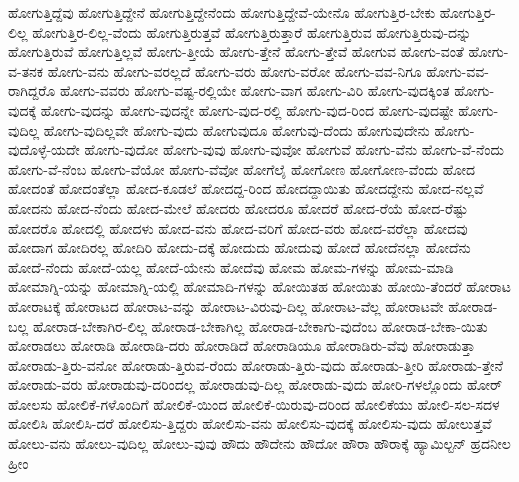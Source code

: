 {ಹೋಗುತ್ತಿದ್ದೆವು
ಹೋಗುತ್ತಿದ್ದೇನೆ
ಹೋಗುತ್ತಿದ್ದೇನೆಂದು
ಹೋಗುತ್ತಿದ್ದೇವೆ-ಯೇನೊ
ಹೋಗುತ್ತಿರ-ಬೇಕು
ಹೋಗುತ್ತಿರ-ಲಿಲ್ಲ
ಹೋಗುತ್ತಿರ-ಲಿಲ್ಲ-ವೆಂದು
ಹೋಗುತ್ತಿರುತ್ತವೆ
ಹೋಗುತ್ತಿರುತ್ತಾರೆ
ಹೋಗುತ್ತಿರುವ
ಹೋಗುತ್ತಿರುವು-ದನ್ನು
ಹೋಗುತ್ತಿರುವೆ
ಹೋಗುತ್ತಿಲ್ಲವೆ
ಹೋಗು-ತ್ತೀಯೆ
ಹೋಗು-ತ್ತೇನೆ
ಹೋಗು-ತ್ತೇವೆ
ಹೋಗುವ
ಹೋಗು-ವಂತೆ
ಹೋಗು-ವ-ತನಕ
ಹೋಗು-ವನು
ಹೋಗು-ವರಲ್ಲದೆ
ಹೋಗು-ವರು
ಹೋಗು-ವರೋ
ಹೋಗು-ವವ-ನಿಗೂ
ಹೋಗು-ವವ-ರಾಗಿದ್ದರೊ
ಹೋಗು-ವವರು
ಹೋಗು-ವಷ್ಟ-ರಲ್ಲಿಯೇ
ಹೋಗು-ವಾಗ
ಹೋಗು-ವಿರಿ
ಹೋಗು-ವುದಕ್ಕಿಂತ
ಹೋಗು-ವುದಕ್ಕೆ
ಹೋಗು-ವುದನ್ನು
ಹೋಗು-ವುದನ್ನೇ
ಹೋಗು-ವುದ-ರಲ್ಲಿ
ಹೋಗು-ವುದ-ರಿಂದ
ಹೋಗು-ವುದಷ್ಟೇ
ಹೋಗು-ವುದಿಲ್ಲ
ಹೋಗು-ವುದಿಲ್ಲವೇ
ಹೋಗು-ವುದು
ಹೋಗುವುದೂ
ಹೋಗುವು-ದೆಂದು
ಹೋಗುವುದೇನು
ಹೋಗು-ವುದೊಳ್ಳೆ-ಯದೇ
ಹೋಗು-ವುದೋ
ಹೋಗು-ವುವು
ಹೋಗು-ವುವೋ
ಹೋಗುವೆ
ಹೋಗು-ವೆನು
ಹೋಗು-ವೆ-ನೆಂದು
ಹೋಗು-ವೆ-ನೆಂಬ
ಹೋಗು-ವೆಯೋ
ಹೋಗು-ವೆವೋ
ಹೋಗೆಲೈ
ಹೋಗೋಣ
ಹೋಗೋಣ-ವೆಂದು
ಹೋದ
ಹೋದಂತೆ
ಹೋದಂತೆಲ್ಲಾ
ಹೋದ-ಕೂಡಲೆ
ಹೋದದ್ದ-ರಿಂದ
ಹೋದದ್ದಾಯಿತು
ಹೋದದ್ದೇನು
ಹೋದ-ನಲ್ಲವೆ
ಹೋದನು
ಹೋದ-ನೆಂದು
ಹೋದ-ಮೇಲೆ
ಹೋದರು
ಹೋದರೂ
ಹೋದರೆ
ಹೋದ-ರೆಯೆ
ಹೋದ-ರೆಷ್ಟು
ಹೋದರೊ
ಹೋದಲ್ಲಿ
ಹೋದಳು
ಹೋದ-ವನು
ಹೋದ-ವರಿಗೆ
ಹೋದ-ವರು
ಹೋದ-ವರೆಲ್ಲಾ
ಹೋದವು
ಹೋದಾಗ
ಹೋದಿರಲ್ಲ
ಹೋದಿರಿ
ಹೋದು-ದಕ್ಕೆ
ಹೋದುದು
ಹೋದುವು
ಹೋದೆ
ಹೋದೆನಲ್ಲಾ
ಹೋದೆನು
ಹೋದೆ-ನೆಂದು
ಹೋದೆ-ಯಲ್ಲ
ಹೋದೆ-ಯೇನು
ಹೋದೆವು
ಹೋಮ
ಹೋಮ-ಗಳನ್ನು
ಹೋಮ-ಮಾಡಿ
ಹೋಮಾಗ್ನಿ-ಯನ್ನು
ಹೋಮಾಗ್ನಿ-ಯಲ್ಲಿ
ಹೋಮಾದಿ-ಗಳನ್ನು
ಹೋಯಿತಹ
ಹೋಯಿತು
ಹೋಯಿ-ತೆಂದರೆ
ಹೋರಾಟ
ಹೋರಾಟಕ್ಕೆ
ಹೋರಾಟದ
ಹೋರಾಟ-ವನ್ನು
ಹೋರಾಟ-ವಿರುವು-ದಿಲ್ಲ
ಹೋರಾಟ-ವೆಲ್ಲ
ಹೋರಾಟವೇ
ಹೋರಾಡ-ಬಲ್ಲ
ಹೋರಾಡ-ಬೇಕಾಗಿರ-ಲಿಲ್ಲ
ಹೋರಾಡ-ಬೇಕಾಗಿಲ್ಲ
ಹೋರಾಡ-ಬೇಕಾಗು-ವುದೆಂಬ
ಹೋರಾಡ-ಬೇಕಾ-ಯಿತು
ಹೋರಾಡಲು
ಹೋರಾಡಿ
ಹೋರಾಡಿ-ದರು
ಹೋರಾಡಿದೆ
ಹೋರಾಡಿಯೂ
ಹೋರಾಡಿರು-ವೆವು
ಹೋರಾಡುತ್ತಾ
ಹೋರಾಡು-ತ್ತಿರು-ವನೋ
ಹೋರಾಡು-ತ್ತಿರುವ-ರೆಂದು
ಹೋರಾಡು-ತ್ತಿರು-ವುದು
ಹೋರಾಡು-ತ್ತೀರಿ
ಹೋರಾಡು-ತ್ತೇನೆ
ಹೋರಾಡು-ವರು
ಹೋರಾಡುವು-ದರಿಂದಲ್ಲ
ಹೋರಾಡುವು-ದಿಲ್ಲ
ಹೋರಾಡು-ವುದು
ಹೋರಿ-ಗಳಲ್ಲೊಂದು
ಹೋರ್
ಹೋಲಸು
ಹೋಲಿಕೆ-ಗಳೊಂದಿಗೆ
ಹೋಲಿಕೆ-ಯಿಂದ
ಹೋಲಿಕೆ-ಯಿರುವು-ದರಿಂದ
ಹೋಲಿಕೆಯು
ಹೋಲಿ-ಸಲ-ಸದಳ
ಹೋಲಿಸಿ
ಹೋಲಿಸಿ-ದರೆ
ಹೋಲಿಸು-ತ್ತಿದ್ದರು
ಹೋಲಿಸು-ವನು
ಹೋಲಿಸು-ವುದಕ್ಕೆ
ಹೋಲಿಸು-ವುದು
ಹೋಲುತ್ತವೆ
ಹೋಲು-ವನು
ಹೋಲು-ವುದಿಲ್ಲ
ಹೋಲು-ವುವು
ಹೌದು
ಹೌದೇನು
ಹೌದೋ
ಹೌರಾ
ಹೌರಾಕ್ಕೆ
ಹ್ಯಾಮಿಲ್ಟನ್
ಹ್ರದನೀಲ
ಹ್ರೀಂ
}
